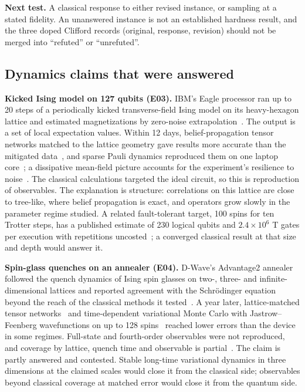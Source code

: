 \textbf{Next test.} A classical response to either revised instance, or sampling at a stated fidelity. An unanswered instance is not an established hardness result, and the three doped Clifford records (original, response, revision) should not be merged into ``refuted'' or ``unrefuted''.

\subsection{Dynamics claims that were answered}
\textbf{Kicked Ising model on 127 qubits (E03).} IBM's Eagle processor ran up to 20 steps of a periodically kicked transverse-field Ising model on its heavy-hexagon lattice and estimated magnetizations by zero-noise extrapolation~\cite{kim2023}. The output is a set of local expectation values. Within 12 days, belief-propagation tensor networks matched to the lattice geometry gave results more accurate than the mitigated data~\cite{tindall2024,aps2024}, and sparse Pauli dynamics reproduced them on one laptop core~\cite{begusic2023,begusic2024}; a dissipative mean-field picture accounts for the experiment's resilience to noise~\cite{dallatorre}. The classical calculations targeted the ideal circuit, so this is reproduction of observables. The explanation is structure: correlations on this lattice are close to tree-like, where belief propagation is exact, and operators grow slowly in the parameter regime studied. A related fault-tolerant target, 100 spins for ten Trotter steps, has a published estimate of 230 logical qubits and $2.4\times10^6$ T gates per execution with repetitions uncosted~\cite{beverland2022}; a converged classical result at that size and depth would answer it.

\textbf{Spin-glass quenches on an annealer (E04).} D-Wave's Advantage2 annealer followed the quench dynamics of Ising spin glasses on two-, three- and infinite-dimensional lattices and reported agreement with the Schr\"odinger equation beyond the reach of the classical methods it tested~\cite{king2025}. A year later, lattice-matched tensor networks~\cite{tindall2025} and time-dependent variational Monte Carlo with Jastrow--Feenberg wavefunctions on up to 128 spins~\cite{mauron2025} reached lower errors than the device in some regimes. Full-state and fourth-order observables were not reproduced, and coverage by lattice, quench time and observable is partial~\cite{kingreply}. The claim is partly answered and contested. Stable long-time variational dynamics in three dimensions at the claimed scales would close it from the classical side; observables beyond classical coverage at matched error would close it from the quantum side.

